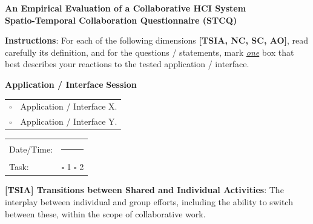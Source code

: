 \documentclass[10pt, onecolumn]{article}
\begin{document}
\begin{center}
    {\Large \textbf{An Empirical Evaluation of a Collaborative HCI System\\     
    \vspace{\baselineskip}
    Spatio-Temporal Collaboration Questionnaire (STCQ)}}
\end{center}

\noindent
\textbf{Instructions}: For each of the following dimensions \textbf{[TSIA, NC, SC, AO]}, read carefully its definition, and for the questions / statements, mark \underline{\emph{one}} box that best describes your reactions to the tested application / interface.


\vspace{\baselineskip}
\noindent
{\large \textbf{Application / Interface}}   \hspace{38mm} {\large \textbf{Session}} 

\begin{tabular}{p{0.5cm}p{6cm}}
    $\square$   & Application / Interface X.\\
    $\square$   & Application / Interface Y.\\
\end{tabular}
\hspace{10mm}
\begin{tabular}{p{2cm}p{6cm}}
    Date/Time:   & \rule{6cm}{0.5pt}\\
    Task:        & $\square$ 1 \hspace{0.2cm} $\square$ 2 \\
\end{tabular}


\vspace{\baselineskip}
\noindent\makebox[\linewidth]{\rule{\columnwidth}{0.4pt}}


\noindent
\textbf{[TSIA] Transitions between Shared and Individual Activities}: The interplay between individual and group efforts, including the ability to switch between these, within the scope of collaborative work.
\end{document}
